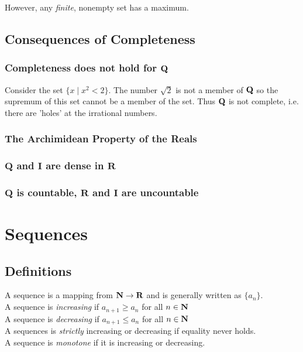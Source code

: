 \documentclass[12pt]{article}
\begin{document}
      However, any \emph{finite}, nonempty set has a maximum.
  \subsection{Consequences of Completeness}
    \subsubsection{Completeness does not hold for $\mathbf{Q}$}
      Consider the set $\{x \mid x^2 < 2\}$. The number $\sqrt{2}$ is not a member of $\mathbf{Q}$ so the supremum of this
      set cannot be a member of the set. Thus $\mathbf{Q}$ is not complete, i.e. there are 'holes' at the irrational numbers.
    \subsubsection{The Archimidean Property of the Reals}
    \subsubsection{$\mathbf{Q}$ and $\mathbf{I}$ are dense in $\mathbf{R}$}
    \subsubsection{$\mathbf{Q}$ is countable, $\mathbf{R}$ and $\mathbf{I}$ are uncountable}
\section{Sequences}
  \subsection{Definitions}
    A sequence is a mapping from $\mathbf{N} \to \mathbf{R}$ and is generally written as $\{a_n\}$.\\

    A sequence is \emph{increasing} if $a_{n+1} \geq a_n$ for all $n \in \mathbf{N}$\\
    A sequence is \emph{decreasing} if $a_{n+1} \leq a_n$ for all $n \in \mathbf{N}$\\
    A sequences is \emph{strictly} increasing or decreasing if equality never holds.\\
    A sequence is \emph{monotone} if it is increasing or decreasing.\\
\end{document}
